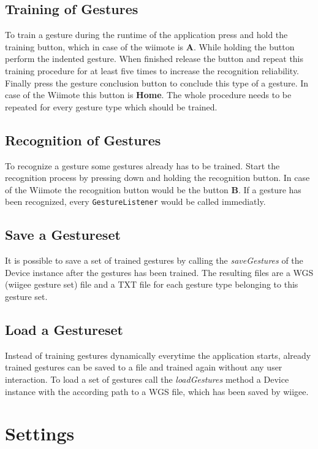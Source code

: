 \documentclass[%
   11pt,              %
   english,           %
   a4paper,           %
   DIV11,             %
   BCOR12mm,		  %
   titlepage,		  %
   bibtotoc,		  %
   liststotoc,		  %
   final,			  %
   twoside,			  %
   openright,		  %
   cleardoubleempty   %
]{scrreprt}%
\begin{document}
\section{Training of Gestures}
To train a gesture during the runtime of the application press and hold the training button, which in case of the wiimote is \textbf{A}. While holding the button perform the indented gesture. When finished release the button and repeat this training procedure for at least five times to increase the recognition reliability. Finally press the gesture conclusion button to conclude this type of a gesture. In case of the Wiimote this button is \textbf{Home}. The whole procedure needs to be repeated for every gesture type which should be trained.

\section{Recognition of Gestures}
To recognize a gesture some gestures already has to be trained. Start the recognition process by pressing down and holding the recognition button. In case of the Wiimote the recognition button would be the button \textbf{B}. If a gesture has been recognized, every \texttt{GestureListener} would be called immediatly.

\section{Save a Gestureset}
It is possible to save a set of trained gestures by calling the \textit{saveGestures} of the Device instance after the gestures has been trained. The resulting files are a WGS (wiigee gesture set) file and a TXT file for each gesture type belonging to this gesture set.

\section{Load a Gestureset}
Instead of training gestures dynamically everytime the application starts, already trained gestures can be saved to a file and trained again without any user interaction. To load a set of gestures call the \textit{loadGestures} method a Device instance with the according path to a WGS file, which has been saved by wiigee.




\chapter{Settings}
\end{document}
